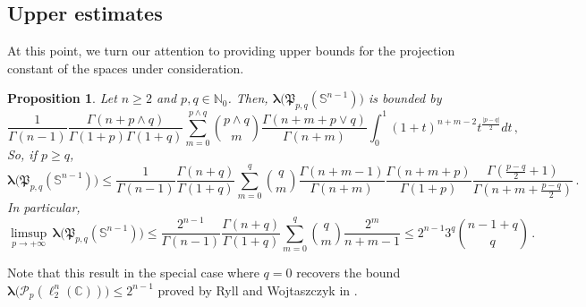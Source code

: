 \documentclass[12pt]{amsart}
\numberwithin{subsection}{section}
\newtheorem{proposition}[theorem]{Proposition}
\theoremstyle{definition}
\theoremstyle{remark}
\begin{document}
\subsection{Upper estimates}

At this point, we turn our attention to providing upper bounds for the projection constant of the spaces under consideration.


\begin{proposition} \label{prop: bound bihom}
  Let   $n \ge 2  $ and $p,q \in \mathbb{N}_0$. Then,  $\boldsymbol{\lambda}\big(\mathfrak{P}_{p,q}(\mathbb{S}^{n-1})\big) $ is bounded by
  \begin{equation}\label{uno}
\frac{1}{\Gamma(n-1)}  \frac{\Gamma(n+p \wedge q)}{\Gamma(1+p) \Gamma(1+q)}
\sum_{m=0}^{p \wedge q} \binom{p \wedge q}{m} \frac{\Gamma(n+m+p \vee q)}{\Gamma(n+m)}
\int_{0}^{1} (1+t)^{n+m-2} t^{\frac{\vert p - q \vert}{2}}  dt\,,
 \end{equation}
So, if  $p \geq q $,
      \begin{equation}\label{due}
      \boldsymbol{\lambda}\big(\mathfrak{P}_{p,q}(\mathbb{S}^{n-1})\big)
  \leq
  \frac{1}{\Gamma(n-1)}  \frac{\Gamma(n+q)}{\Gamma(1+q)}
  \sum_{m=0}^{q} \binom{q}{m}
    \frac{\Gamma(n+m-1)}{\Gamma(n+m)}\frac{\Gamma(n+m+p)}{\Gamma(1+p)}
    \frac{\Gamma(\frac{p-q}{2}+1)}{\Gamma(n+m+\frac{p-q}{2})}\,.
      \end{equation}
    \vspace{2mm}
    In particular,
       \begin{equation}\label{tres}
       \limsup_{p \to + \infty} \, \boldsymbol{\lambda}\big(\mathfrak{P}_{p,q}(\mathbb{S}^{n-1})\big)
  \leq \frac{2^{n-1}}{\Gamma(n-1)}  \frac{\Gamma(n+q)}{\Gamma(1+q)}
  \sum_{m=0}^{q} \binom{q}{m}
    \frac{2^{m}}{n+m-1} \le 2^{n-1}3^q\binom{n-1+q}{q}
  \,.
      \end{equation}
    \end{proposition}

  Note that this result in the special case where  $q=0 $ recovers the bound   $\boldsymbol{\lambda}\big(\mathcal{P}_{p}(\ell_2^n(\mathbb{C}))\big)
  \leq 2^{n-1} $ proved by  Ryll and Wojtaszczyk in \cite[Proposition 1.1]{ryll1983homogeneous}.
\end{document}
